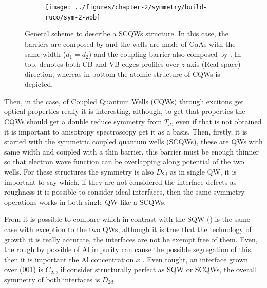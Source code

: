\begin{figure}[ht!]
	\centering
	\begin{subfigure}{\textwidth}
		\texttt{[image: ../figures/chapter-2/symmetry/build-ruco/sym-2-wob]}
		\label{subfig:subsubsec:chapter-2-scoupled-quantum-wells-a}
		\label{subfig:subsubsec:chapter-2-scoupled-quantum-wells-b}
	\end{subfigure}
	\caption
	{
General scheme to describe a SCQWs structure. In this case, the barriers are composed by \algaas and the wells are made of GaAs with the same width ($d_{1}=d_{2}$) and the coupling barrier also composed by \algaas. In top,  denotes both CB and VB edges profiles over $z$-axis (Real-space) direction, whereas in bottom  the atomic structure of \gls{CQWs} is depicted.
	}\label{fig:subsubsec:chapter-2-scoupled-quantum-wells}
\end{figure}

Then, in the case, of Coupled Quantum Wells (\gls{CQWs}) through excitons get optical properties really it is interesting, although, to get that properties the \gls{CQWs} should get a double reduce symmetry from $T_{d}$, even if that is not obtained it is important to anisotropy spectroscopy get it as a basis. 
Then, firstly, it is started with the symmetric coupled quantum wells (\gls{SCQWs}), these are \gls{QW}s with same width and coupled with a thin barrier, this barrier must be enough thinner so that electron wave function can be overlapping along potential of the two wells. 
For these structures the symmetry is also $D_{2d}$ as in single \gls{QW}, it is important to say which, if they are not  considered the  interface defects as roughness it is possible to consider  ideal interfaces, then the same symmetry operations works in both single \gls{QW} like a \gls{SCQWs}. 

From  it is possible to compare which in contrast with the SQW () is the same case with exception to the two \gls{QW}s, although it is true that the technology of growth it is really accurate, the interfaces are not be exempt  free of them. Even, the rough by possible of Al impurity can cause the possible segregation of this, then it is important the Al concentration $x$ \cite{chand1990origin,tillmann2002direct}. Even tought, an interface grown over (001) is $C_{2v}$, if consider structurally perfect as \gls{SQW} or \gls{SCQWs}, the overall symmetry of both interfaces is $D_{2d}$\cite{magri2000anticrossing}.

